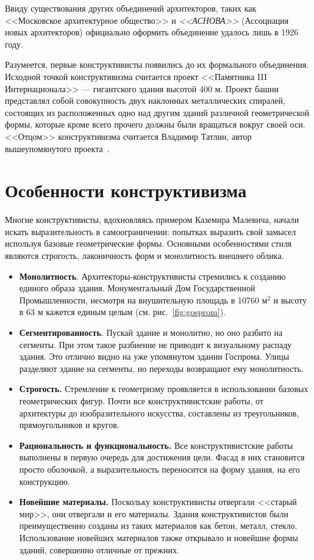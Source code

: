 Ввиду существования других объединений архитекторов, таких как
<<Московское архитектурное общество>> и \textit{<<АСНОВА>>} (Ассоциация новых архитекторов)
официально оформить объединение удалось лишь в 1926 году.

Разумеется, первые конструктивисты появились до их формального объединения.
Исходной точкой конструктивизма считается проект
<<Памятника III Интернационала>> --- гигантского здания высотой 400 м.
Проект башни представлял собой совокупность двух наклонных металлических спиралей,
состоящих из расположенных одно над другим зданий различной геометрической формы,
которые кроме всего прочего должны были вращаться вокруг своей оси.
<<Отцом>> конструктивизма считается Владимир Татлин, автор вышеупомянутого проекта~\cite{сидорина2007лики}.



\section{Особенности конструктивизма}
Многие конструктивисты, вдохновляясь примером Каземира Малевича, начали искать выразительность в
самоограничении: попытках выразить свой замысел используя базовые геометрические формы.
Основными особенностями стиля являются строгость, лаконичность форм и монолитность внешнего облика.
\begin{itemize}
    \item \textbf{Монолитность}.
    Архитекторы-конструктивисты стремились к созданию единого образа здания.
    Монументальный Дом Государственной Промышленности, несмотря на внушительную площадь в 10760 $\text{м}^2$ и
    высоту в 63 м кажется единым целым (см. рис.~\ref{fig:gosprom}).

        
    \item \textbf{Сегментированность}.
    Пускай здание и монолитно, но оно разбито на сегменты.
    При этом такое разбиение не приводит к визуальному распаду здания.
    Это отлично видно на уже упомянутом здании Госпрома.
    Улицы разделяют здание на сегменты, но переходы возвращают ему монолитность.


    \item \textbf{Строгость.}
    Стремление к геометризму проявляется в использовании базовых геометрических фигур.
    Почти все конструктивистские работы, от архитектуры до изобразительного искусства,
    составлены из треугольников, прямоугольников и кругов.

    \item \textbf{Рациональность и функциональность.}
    Все конструктивистские работы выполнены в первую очередь для достижения цели.
    Фасад в них становится просто оболочкой, а выразительность переносится на форму здания, на его конструкцию.
    
    
    \item \textbf{Новейшие материалы.}
    Поскольку конструктивисты отвергали <<старый мир>>, они отвергали и его материалы.
    Здания конструктивистов были преимущественно созданы из таких материалов как бетон, металл, стекло.
    Использование новейших материалов также открывало и новейшие формы зданий, совершенно отличные от прежних.
    
\end{itemize}

